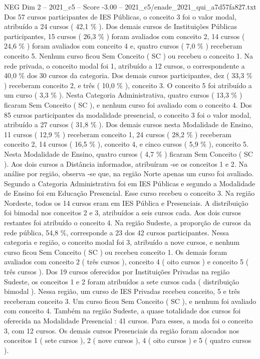 \begin{textsample}{NEG Dim 2 – 2021\_c5 – Score -3.00 – 2021\_c5/enade\_2021\_qui\_a7d57fa827.txt}
Dos 57 cursos participantes de IES Públicas, o conceito 3 foi o valor modal, atribuído a 24 cursos ( 42,1 \% ).
Dos demais cursos de Instituições Públicas participantes, 15 cursos ( 26,3 \% ) foram avaliados com conceito 2, 14 cursos ( 24,6 \% ) foram avaliados com conceito 4 e, quatro cursos ( 7,0 \% ) receberam conceito 5.
Nenhum curso ficou Sem Conceito ( SC ) ou recebeu o conceito 1.
Na rede privada, o conceito modal foi 1, atribuído a 12 cursos, o correspondente a 40,0 \% dos 30 cursos da categoria.
Dos demais cursos participantes, dez ( 33,3 \% ) receberam conceito 2, e três ( 10,0 \% ), conceito 3.
O conceito 5 foi atribuído a um curso ( 3,3 \% ).
Nesta Categoria Administrativa, quatro cursos ( 13,3 \% ) ficaram Sem Conceito ( SC ), e nenhum curso foi avaliado com o conceito 4.
Dos 85 cursos participantes da modalidade presencial, o conceito 3 foi o valor modal, atribuído a 27 cursos ( 31,8 \% ).
Dos demais cursos nesta Modalidade de Ensino, 11 cursos ( 12,9 \% ) receberam conceito 1, 24 cursos ( 28,2 \% ) receberam conceito 2, 14 cursos ( 16,5 \% ), conceito 4, e cinco cursos ( 5,9 \% ), conceito 5.
Nesta Modalidade de Ensino, quatro cursos ( 4,7 \% ) ficaram Sem Conceito ( SC ).
Aos dois cursos a Distância informados, atribuíram -se os conceitos 1 e 2.
Na análise por região, observa -se que, na região Norte apenas um curso foi avaliado.
Segundo a Categoria Administrativa foi em IES Públicas e segundo a Modalidade de Ensino foi em Educação Presencial.
Esse curso recebeu o conceito 3.
Na região Nordeste, todos os 14 cursos eram em IES Pública e Presenciais.
A distribuição foi bimodal nos conceitos 2 e 3, atribuídos a seis cursos cada.
Aos dois cursos restantes foi atribuído o conceito 4.
Na região Sudeste, a proporção de cursos da rede pública, 54,8 \%, corresponde a 23 dos 42 cursos participantes.
Nessa categoria e região, o conceito modal foi 3, atribuído a nove cursos, e nenhum curso ficou Sem Conceito ( SC ) ou recebeu conceito 1.
Os demais foram avaliados com conceito 2 ( três cursos ), conceito 4 ( oito cursos ) e conceito 5 ( três cursos ).
Dos 19 cursos oferecidos por Instituições Privadas na região Sudeste, os conceitos 1 e 2 foram atribuídos a sete cursos cada ( distribuição bimodal ).
Nessa região, um curso de IES Privadas recebeu conceito, 5 e três receberam conceito 3.
Um curso ficou Sem Conceito ( SC ), e nenhum foi avaliado com conceito 4.
Também na região Sudeste, a quase totalidade dos cursos foi oferecida na Modalidade Presencial : 41 cursos.
Para esses, a moda foi o conceito 3, com 12 cursos.
Os demais cursos Presenciais da região foram alocados nos conceitos 1 ( sete cursos ), 2 ( nove cursos ), 4 ( oito cursos ) e 5 ( quatro cursos ).

\end{textsample}
